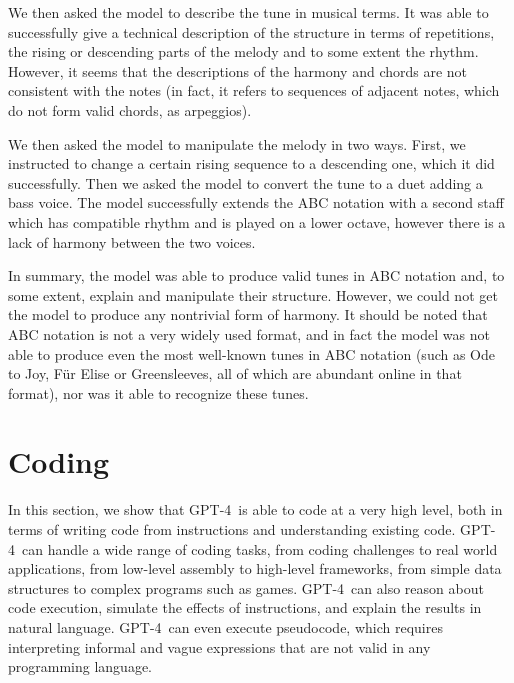 We then asked the model to describe the tune in musical terms. It was able to successfully give a technical description of the structure in terms of repetitions, the rising or descending parts of the melody and to some extent the rhythm. However, it seems that the descriptions of the harmony and chords are not consistent with the notes (in fact, it refers to sequences of adjacent notes, which do not form valid chords, as arpeggios).

We then asked the model to manipulate the melody in two ways. First, we instructed to change a certain rising sequence to a descending one, which it did successfully. Then we asked the model to convert the tune to a duet adding a bass voice. The model successfully extends the ABC notation with a second staff which has compatible rhythm and is played on a lower octave, however there is a lack of harmony between the two voices.

In summary, the model was able to produce valid tunes in ABC notation and, to some extent, explain and manipulate their structure. However, we could not get the model to produce any nontrivial form of harmony. It should be noted that ABC notation is not a very widely used format, and in fact the model was not able to produce even the most well-known tunes in ABC notation (such as Ode to Joy, F\"{u}r Elise or Greensleeves, all of which are abundant online in that format), nor was it able to recognize these tunes.

\section{Coding}
\label{sec:code}

In this section, we show that GPT-4\ is able to code at a very high level, both in terms of writing code from instructions and understanding existing code. GPT-4\ can handle a wide range of coding tasks, from coding challenges to real world applications, from low-level assembly to high-level frameworks, from simple data structures to complex programs such as games. GPT-4\ can also reason about code execution, simulate the effects of instructions, and explain the results in natural language. GPT-4\ can even execute pseudocode, which requires interpreting informal and vague expressions that are not valid in any programming language.

